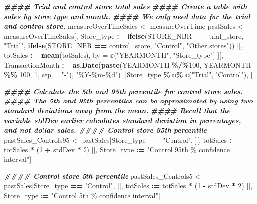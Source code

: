 \documentclass[
]{article}
\newenvironment{Shaded}{\begin{snugshade}}{\end{snugshade}}
\newcommand{\AttributeTok}[1]{\textcolor[rgb]{0.13,0.29,0.53}{#1}}
\newcommand{\DecValTok}[1]{\textcolor[rgb]{0.00,0.00,0.81}{#1}}
\newcommand{\DocumentationTok}[1]{\textcolor[rgb]{0.56,0.35,0.01}{\textbf{\textit{#1}}}}
\newcommand{\FunctionTok}[1]{\textcolor[rgb]{0.13,0.29,0.53}{\textbf{#1}}}
\newcommand{\NormalTok}[1]{#1}
\newcommand{\OtherTok}[1]{\textcolor[rgb]{0.56,0.35,0.01}{#1}}
\newcommand{\SpecialCharTok}[1]{\textcolor[rgb]{0.81,0.36,0.00}{\textbf{#1}}}
\newcommand{\StringTok}[1]{\textcolor[rgb]{0.31,0.60,0.02}{#1}}
\begin{document}
\begin{Shaded}
\begin{Highlighting}[]
\DocumentationTok{\#\#\#\# Trial and control store total sales}
\DocumentationTok{\#\#\#\# Create a table with sales by store type and month.}
\DocumentationTok{\#\#\#\# We only need data for the trial and control store.}
\NormalTok{measureOverTimeSales }\OtherTok{\textless{}{-}}\NormalTok{ measureOverTime}
\NormalTok{pastSales }\OtherTok{\textless{}{-}}\NormalTok{ measureOverTimeSales[, Store\_type }\SpecialCharTok{:=} \FunctionTok{ifelse}\NormalTok{(STORE\_NBR }\SpecialCharTok{==}\NormalTok{ trial\_store, }\StringTok{"Trial"}\NormalTok{,}
\FunctionTok{ifelse}\NormalTok{(STORE\_NBR }\SpecialCharTok{==}\NormalTok{ control\_store, }\StringTok{"Control"}\NormalTok{, }\StringTok{"Other stores"}\NormalTok{))}
\NormalTok{][, totSales }\SpecialCharTok{:=} \FunctionTok{mean}\NormalTok{(totSales), by }\OtherTok{=} \FunctionTok{c}\NormalTok{(}\StringTok{"YEARMONTH"}\NormalTok{, }\StringTok{"Store\_type"}\NormalTok{)}
\NormalTok{][, TransactionMonth }\SpecialCharTok{:=} \FunctionTok{as.Date}\NormalTok{(}\FunctionTok{paste}\NormalTok{(YEARMONTH }\SpecialCharTok{\%/\%}\DecValTok{100}\NormalTok{, YEARMONTH }\SpecialCharTok{\%\%} \DecValTok{100}\NormalTok{, }\DecValTok{1}\NormalTok{, }\AttributeTok{sep =} \StringTok{"{-}"}\NormalTok{), }\StringTok{"\%Y{-}\%m{-}\%d"}\NormalTok{)}
\NormalTok{][Store\_type }\SpecialCharTok{\%in\%} \FunctionTok{c}\NormalTok{(}\StringTok{"Trial"}\NormalTok{, }\StringTok{"Control"}\NormalTok{), ]}

\DocumentationTok{\#\#\#\# Calculate the 5th and 95th percentile for control store sales.}
\DocumentationTok{\#\#\#\# The 5th and 95th percentiles can be approximated by using two standard deviations away from the mean.}
\DocumentationTok{\#\#\#\# Recall that the variable stdDev earlier calculates standard deviation in percentages, and not dollar sales.}
\DocumentationTok{\#\#\#\# Control store 95th percentile}
\NormalTok{pastSales\_Controls95 }\OtherTok{\textless{}{-}}\NormalTok{ pastSales[Store\_type }\SpecialCharTok{==} \StringTok{"Control"}\NormalTok{,}
\NormalTok{][, totSales }\SpecialCharTok{:=}\NormalTok{ totSales }\SpecialCharTok{*}\NormalTok{ (}\DecValTok{1} \SpecialCharTok{+}\NormalTok{ stdDev }\SpecialCharTok{*} \DecValTok{2}\NormalTok{)}
\NormalTok{][, Store\_type }\SpecialCharTok{:=} \StringTok{"Control 95th \% confidence interval"}\NormalTok{]}

\DocumentationTok{\#\#\#\# Control store 5th percentile}
\NormalTok{pastSales\_Controls5 }\OtherTok{\textless{}{-}}\NormalTok{ pastSales[Store\_type }\SpecialCharTok{==} \StringTok{"Control"}\NormalTok{,}
\NormalTok{][, totSales }\SpecialCharTok{:=}\NormalTok{ totSales }\SpecialCharTok{*}\NormalTok{ (}\DecValTok{1} \SpecialCharTok{{-}}\NormalTok{ stdDev }\SpecialCharTok{*} \DecValTok{2}\NormalTok{)}
\NormalTok{][, Store\_type }\SpecialCharTok{:=} \StringTok{"Control 5th \% confidence interval"}\NormalTok{]}


\end{Highlighting}
\end{Shaded}
\end{document}
